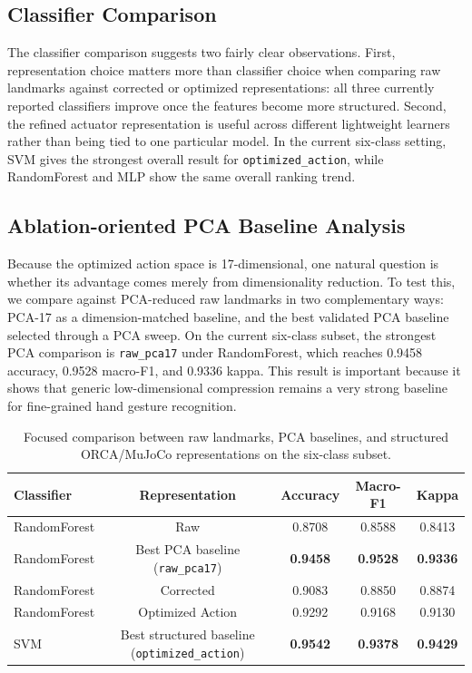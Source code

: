 \documentclass[11pt]{article}
\begin{document}
\subsection{Classifier Comparison}
The classifier comparison suggests two fairly clear observations. First, representation choice matters more than classifier choice when comparing raw landmarks against corrected or optimized representations: all three currently reported classifiers improve once the features become more structured. Second, the refined actuator representation is useful across different lightweight learners rather than being tied to one particular model. In the current six-class setting, SVM gives the strongest overall result for \texttt{optimized\_action}, while RandomForest and MLP show the same overall ranking trend.

\subsection{Ablation-oriented PCA Baseline Analysis}
Because the optimized action space is 17-dimensional, one natural question is whether its advantage comes merely from dimensionality reduction. To test this, we compare against PCA-reduced raw landmarks in two complementary ways: PCA-17 as a dimension-matched baseline, and the best validated PCA baseline selected through a PCA sweep. On the current six-class subset, the strongest PCA comparison is \texttt{raw\_pca17} under RandomForest, which reaches 0.9458 accuracy, 0.9528 macro-F1, and 0.9336 kappa. This result is important because it shows that generic low-dimensional compression remains a very strong baseline for fine-grained hand gesture recognition.

\begin{table}[t]
\centering
\caption{Focused comparison between raw landmarks, PCA baselines, and structured ORCA/MuJoCo representations on the six-class subset.}
\label{tab:rf_pca}
\small
\begin{tabular}{@{}lcccc@{}}
\toprule
Classifier & Representation & Accuracy & Macro-F1 & Kappa \\
\midrule
RandomForest & Raw & 0.8708 & 0.8588 & 0.8413 \\
RandomForest & Best PCA baseline (\texttt{raw\_pca17}) & \textbf{0.9458} & \textbf{0.9528} & \textbf{0.9336} \\
RandomForest & Corrected & 0.9083 & 0.8850 & 0.8874 \\
RandomForest & Optimized Action & 0.9292 & 0.9168 & 0.9130 \\
SVM & Best structured baseline (\texttt{optimized\_action}) & \textbf{0.9542} & \textbf{0.9378} & \textbf{0.9429} \\
\bottomrule
\end{tabular}
\end{table}
\end{document}
